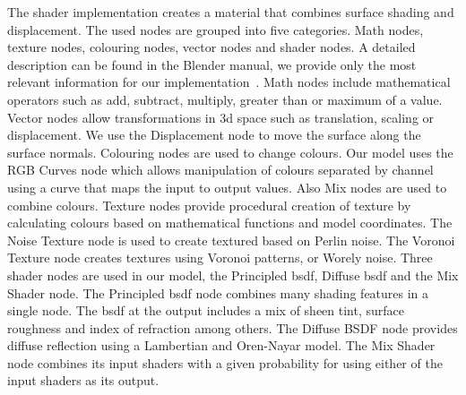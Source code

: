 The shader implementation creates a material that combines surface shading and displacement. The used nodes are grouped into five categories. Math nodes, texture nodes, colouring nodes, vector nodes and shader nodes. A detailed description can be found in the Blender manual, we provide only the most relevant information for our implementation~\cite{IntroductionManual}.
Math nodes include mathematical operators such as add, subtract, multiply, greater than or maximum of a value. Vector nodes allow transformations in \gls{3d} space such as translation, scaling or displacement. We use the Displacement node to move the surface along the surface normals. Colouring nodes are used to change colours. Our model uses the RGB Curves node which allows manipulation of colours separated by channel using a curve that maps the input to output values. Also Mix nodes are used to combine colours. Texture nodes provide procedural creation of texture by calculating colours based on mathematical functions and model coordinates. The Noise Texture node is used to create textured based on Perlin noise. The Voronoi Texture node creates textures using Voronoi patterns, or Worely noise. Three shader nodes are used in our model, the Principled \gls{bsdf}, Diffuse \gls{bsdf} and the Mix Shader node. The Principled \gls{bsdf} node combines many shading features in a single node. The \gls{bsdf} at the output includes a mix of sheen tint, surface roughness and index of refraction among others. The Diffuse BSDF node provides diffuse reflection using a Lambertian and Oren-Nayar model. The Mix Shader node combines its input shaders with a given probability for using either of the input shaders as its output.

